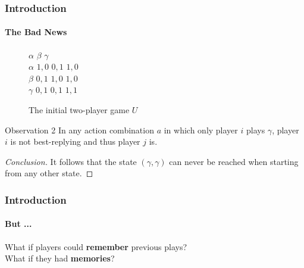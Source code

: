 \documentclass{beamer}
\begin{document}
\begin{frame}
    \frametitle{Introduction}
    \framesubtitle{The Bad News}
    \vspace{-20pt}
    \begin{figure}[h]
    \centering
    \begin{game}{3}{3}
            \>  $\alpha$ \>  $\beta$  \> $\gamma$ \\
         $\alpha$    \>  $1, 0$ \> $0, 1$ \> $1,0$\\
         $\beta$      \>  $0, 1$ \> $1, 0$ \> $1, 0$\\
         $\gamma$ \>  $0, 1$ \> $0, 1$ \> $1, 1$\\
    \end{game}
    \caption{The initial two-player game $U$}
    \end{figure}
    \vspace{-10pt}
    \begin{exampleblock}{Observation 2}
        In any action combination $a$ in which only player $i$ plays $\gamma$, player
        $i$ is not best-replying and thus player $j$ is.
    \end{exampleblock}
    \pause
    \begin{proof}[Conclusion]
        It follows that the state $(\gamma, \gamma)$ can
        never be reached when starting from any other state.
    \end{proof}
\end{frame}


\begin{frame}
    \frametitle{Introduction}
    \framesubtitle{But ...}
    \begin{center}
        What if players could \textbf{remember} previous plays?\\
        What if they had \textbf{memories}?
    \end{center}
\end{frame}

\end{document}
